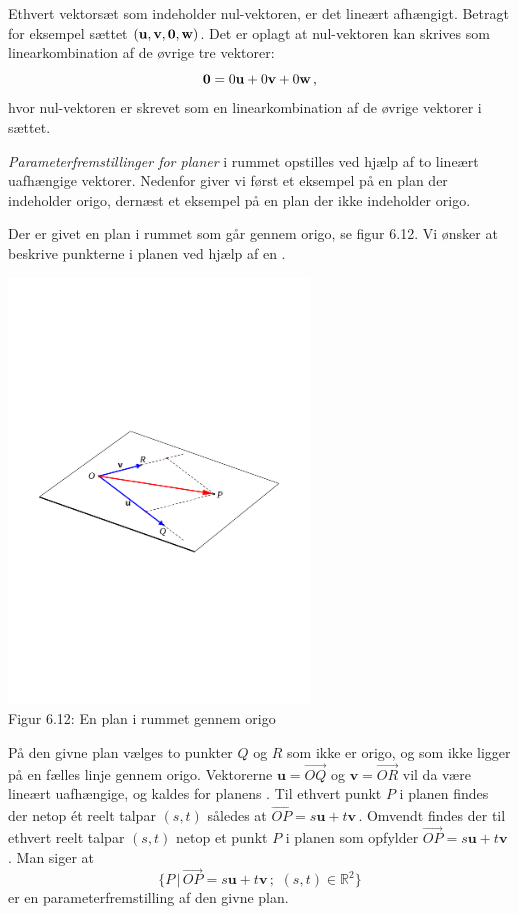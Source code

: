 \begin{example}
Ethvert vektorsæt som indeholder nul-vektoren, er det lineært afhængigt. Betragt for eksempel sættet $(\mathbf u,\mathbf{v},\bm{0},\mathbf w)$. Det er oplagt at nul-vektoren kan skrives som linearkombination af de øvrige tre vektorer:
$$
\bm{0}=0\mathbf u+0\mathbf{v}+0\mathbf w\,,
$$hvor nul-vektoren er skrevet som en linearkombination af de øvrige vektorer i sættet.
\end{example}

\textit{Parameterfremstillinger for planer} i rummet opstilles ved hjælp af to lineært uafhængige vektorer. Nedenfor giver vi først et eksempel på en plan der indeholder origo, dernæst et eksempel på en plan der ikke indeholder origo.
\begin{example}\label{tn6.planRum1}
Der er givet en plan i rummet som går gennem origo, se figur 6.12. Vi ønsker at beskrive punkterne i planen ved hjælp af en .
\begin{center}
		\includegraphics[trim=2cm 10cm 2cm
 10cm,width=0.60\textwidth,clip]{geometer/vektor14.pdf}
  \\Figur 6.12: En plan i rummet gennem origo		
 
\end{center}
På den givne plan vælges to punkter $Q$ og $R$ som ikke er origo, og som ikke ligger på en fælles linje gennem origo. Vektorerne $\mathbf u=\stackrel{\rightarrow}{OQ}$ og $\mathbf v=\stackrel{\rightarrow}{OR}$ vil da være lineært uafhængige, og kaldes for planens . Til ethvert punkt $P$ i planen findes der netop ét reelt talpar $(s,t)$ således at  
$\stackrel{\rightarrow}{OP}=s\mathbf u+t\mathbf v\,$. Omvendt findes der til ethvert reelt talpar $(s,t)$ netop et punkt $P$ i planen som opfylder $\stackrel{\rightarrow}{OP}=s\mathbf u+t\mathbf v\,$. Man siger at
$$
\{P\,|\, \stackrel{\rightarrow}{OP}=s\mathbf u+t\mathbf v\,;\,\,(s,t)\in \mathbb R^2\}
$$
er en parameterfremstilling af den givne plan.
\end{example}
